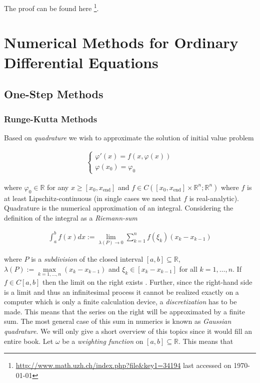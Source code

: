 \begin{Proof}
	The proof can be found here \footnote{\href{http://www.math.uzh.ch/index.php?file&key1=34194}{http://www.math.uzh.ch/index.php?file\&key1=34194} last accessed on \today}.
\end{Proof}

\section{Numerical Methods for Ordinary Differential Equations}
\subsection{One-Step Methods}
\subsubsection{Runge-Kutta Methods}

Based on \emph{quadrature} we wish to approximate the solution of initial value problem

\begin{gather}
	\begin{cases}
		\varphi'(x) = f\left( x,\varphi(x) \right)\\
		\varphi(x_0) = \varphi_0
	\end{cases}
\end{gather}

where $\varphi_0 \in \mathbb{R}$ for any $x \geqslant [x_0, x_{\mathrm{end}}]$ and $f \in C([x_0,x_{\mathrm{end}}] \times \mathbb{R}^n;\mathbb{R}^n)$ where $f$ is at least Lipschitz-continuous (in single cases we need that $f$ is real-analytic).\\
Quadrature is the numerical approximation of an integral. Considering the definition of the integral as a \emph{Riemann-sum}

\begin{gather}
	\boxed{\int_a^b f(x) dx := \lim\limits_{\lambda(P) \rightarrow 0} \sum\limits_{k = 1}^n f(\xi_k) \left( x_{k} - x_{k-1} \right)}
\end{gather}

where $P$ is a \emph{subdivision} of the closed interval $[a,b] \subseteq \mathbb{R}$, $\lambda(P) := \max\limits_{k = 1,\hdots,n} \left( x_{k} - x_{k-1} \right)$ and $\xi_k \in [x_{k} - x_{k-1}]$ for all $k = 1,\hdots, n$. If $f \in C[a,b]$ then the limit on the right exists \cite[353]{Analysis_I_ZORICH}. Further, since the right-hand side is a limit and thus an infinitesimal process it cannot be realized exactly on a computer which is only a finite calculation device, a \emph{discretization} has to be made. This means that the series on the right will be approximated by a finite sum. The most general case of this sum in numerics is known as \emph{Gaussian quadrature}. We will only give a short overview of this topics since it would fill an entire book. Let $\omega$ be a \emph{weighting function} on $[a,b] \subseteq \mathbb{R}$. This means that

